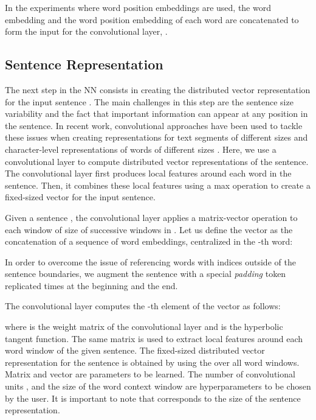 \documentclass[11pt]{article}
\begin{document}
In the experiments where word position embeddings are used,
the word embedding and the word position embedding of each word are concatenated to form the input for the convolutional layer, .

\subsection{Sentence Representation}
The next step in the NN consists in creating the distributed vector representation  for the input sentence .
The main challenges in this step are the sentence size variability and the fact that important information can appear at any position in the sentence.
In recent work,
convolutional approaches have been used to tackle these issues when creating representations for text segments of different sizes \cite{zeng2014:coling,Hu@NIPS2014,santos2014:coling} and
character-level representations of words of different sizes \cite{santos2014:icml}.
Here,
we use a convolutional layer to compute distributed vector representations of the sentence.
The convolutional layer first produces local features around each word in the sentence.
Then, 
it combines these local features using a max operation to
create a fixed-sized vector for the input sentence.
 
Given a sentence ,
the convolutional layer applies a matrix-vector operation to each window of size  of successive windows in .
Let us define the vector  as the concatenation of a sequence of  word embeddings,
centralized in the -th word:

In order to overcome the issue of referencing words with indices outside of the sentence boundaries, 
we augment the sentence with a special \emph{padding} token replicated  times at the beginning and the end.



The convolutional layer computes the -th element of the vector  as follows:

where  is the weight matrix of the convolutional layer
and  is the hyperbolic tangent function.
The same matrix is used to extract local features around each word window of the given sentence.
The fixed-sized distributed vector representation for the sentence is obtained by using the  over all word windows.
Matrix  and vector  are parameters to be learned.
The number of convolutional units ,
and the size of the word context window 
are hyperparameters to be chosen by the user.
It is important to note that  corresponds to the size of the sentence representation.
\end{document}
